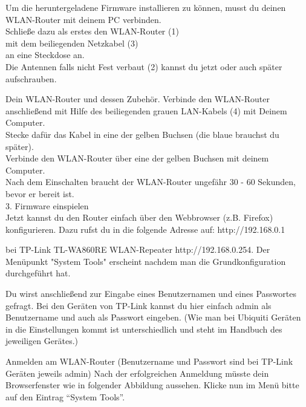 \documentclass[11pt, a4paper,ngerman]{article}
\begin{document}
Um die heruntergeladene Firmware installieren zu können, musst du deinen WLAN-Router mit deinem PC verbinden. \\
Schließe dazu als erstes den WLAN-Router (1) \\
mit dem beiliegenden Netzkabel (3) \\
an eine Steckdose an. \\

Die Antennen falls nicht Fest verbaut (2) kannst du jetzt oder auch später aufschrauben.




Dein WLAN-Router und dessen Zubehör.
Verbinde den WLAN-Router anschließend mit Hilfe des beiliegenden grauen LAN-Kabels (4) mit Deinem Computer. \\
Stecke dafür das Kabel in eine der gelben Buchsen (die blaue brauchst du später). \\






Verbinde den WLAN-Router über eine der gelben Buchsen mit deinem Computer. \\
Nach dem Einschalten braucht der WLAN-Router ungefähr 30 - 60 Sekunden, bevor er bereit ist. \\



{\Large 3. Firmware einspielen} \\

Jetzt kannst du den Router einfach über den Webbrowser (z.B. Firefox) konfigurieren. Dazu rufst du in die folgende Adresse auf: http://192.168.0.1

bei TP-Link TL-WA860RE WLAN-Repeater  http://192.168.0.254. Der Menüpunkt "System Tools" erscheint nachdem man die Grundkonfiguration durchgeführt hat.

Du wirst anschließend zur Eingabe eines Benutzernamen und eines Passwortes gefragt. Bei den Geräten von TP-Link kannst du hier einfach admin als Benutzername und auch als Passwort eingeben. (Wie man bei Ubiquiti Geräten in die Einstellungen kommt ist unterschiedlich und steht im Handbuch des jeweiligen Gerätes.)





Anmelden am WLAN-Router (Benutzername und Passwort sind bei TP-Link Geräten jeweils admin)
Nach der erfolgreichen Anmeldung müsste dein Browserfenster wie in folgender Abbildung aussehen. Klicke nun im Menü bitte auf den Eintrag “System Tools”.
\end{document}
